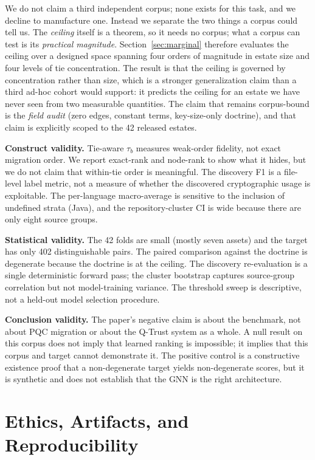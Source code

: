 \documentclass[conference,10pt]{IEEEtran}
\newcommand{\tb}{\tau_b}
\begin{document}
We do not claim a third independent corpus; none exists for this task, and we decline to
manufacture one. Instead we separate the two things a corpus could tell us. The \emph{ceiling}
itself is a theorem, so it needs no corpus; what a corpus can test is its \emph{practical
magnitude}. Section~\ref{sec:marginal} therefore evaluates the ceiling over a designed space
spanning four orders of magnitude in estate size and four levels of tie concentration. The result
is that the ceiling is governed by concentration rather than size, which is a stronger
generalization claim than a third ad-hoc cohort would support: it predicts the ceiling for an
estate we have never seen from two measurable quantities. The claim that remains corpus-bound is
the \emph{field audit} (zero edges, constant terms, key-size-only doctrine), and that claim is
explicitly scoped to the 42 released estates.

\textbf{Construct validity.} Tie-aware $\tb$ measures weak-order fidelity, not exact migration
order. We report exact-rank and node-rank to show what it hides, but we do not claim that
within-tie order is meaningful. The discovery F1 is a file-level label metric, not a measure of
whether the discovered cryptographic usage is exploitable. The per-language macro-average is
sensitive to the inclusion of undefined strata (Java), and the repository-cluster CI is wide
because there are only eight source groups.

\textbf{Statistical validity.} The 42 folds are small (mostly seven assets) and the target has
only 402 distinguishable pairs. The paired comparison against the doctrine is degenerate because
the doctrine is at the ceiling. The discovery re-evaluation is a single deterministic forward
pass; the cluster bootstrap captures source-group correlation but not model-training variance.
The threshold sweep is descriptive, not a held-out model selection procedure.

\textbf{Conclusion validity.} The paper's negative claim is about the benchmark, not about PQC
migration or about the Q-Trust system as a whole. A null result on this corpus does not imply
that learned ranking is impossible; it implies that this corpus and target cannot demonstrate
it. The positive control is a constructive existence proof that a non-degenerate target yields
non-degenerate scores, but it is synthetic and does not establish that the GNN is the right
architecture.

\section{Ethics, Artifacts, and Reproducibility}
\label{sec:artifacts}
\end{document}
